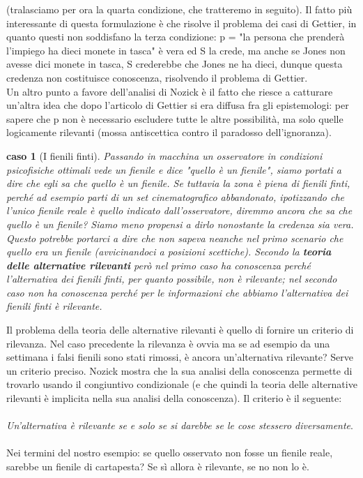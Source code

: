 \documentclass[10pt,a4paper]{article}
\newtheorem{caso}{caso}
\begin{document}
(tralasciamo per ora la quarta condizione, che tratteremo in seguito). Il fatto più interessante di questa formulazione è che risolve il problema dei casi di Gettier, in quanto questi non soddisfano la terza condizione: p = "la persona che prenderà l'impiego ha dieci monete in tasca" è vera ed S la crede, ma anche se Jones non avesse dici monete in tasca, S crederebbe che Jones ne ha dieci, dunque questa credenza non costituisce conoscenza, risolvendo il problema di Gettier.\\
Un altro punto a favore dell'analisi di Nozick è il fatto che riesce a catturare un'altra idea che dopo l'articolo di Gettier si era diffusa fra gli epistemologi: per sapere che p non è necessario escludere tutte le altre possibilità, ma solo quelle logicamente rilevanti (mossa antiscettica contro il paradosso dell'ignoranza). 
\begin{caso}[I fienili finti]
	Passando in macchina un osservatore in condizioni psicofisiche ottimali vede un fienile e dice "quello è un fienile", siamo portati a dire che egli sa che quello è un fienile. Se tuttavia la zona è piena di fienili finti, perché ad esempio parti di un set cinematografico abbandonato, ipotizzando che l'unico fienile reale è quello indicato dall'osservatore, diremmo ancora che sa che quello è un fienile? Siamo meno propensi a dirlo nonostante la credenza sia vera.\\
	Questo potrebbe portarci a dire che non sapeva neanche nel primo scenario che quello era un fienile (avvicinandoci a posizioni scettiche). Secondo la \textbf{teoria delle alternative rilevanti} però nel primo caso ha conoscenza perché l'alternativa dei fienili finti, per quanto possibile, non è rilevante; nel secondo caso non ha conoscenza perché per le informazioni che abbiamo l'alternativa dei fienili finti è rilevante.
\end{caso}
Il problema della teoria delle alternative rilevanti è quello di fornire un criterio di rilevanza. Nel caso precedente la rilevanza è ovvia ma se ad esempio da una settimana i falsi fienili sono stati rimossi, è ancora un'alternativa rilevante? Serve un criterio preciso. Nozick mostra che la sua analisi della conoscenza permette di trovarlo usando il congiuntivo condizionale (e che quindi la teoria delle alternative rilevanti è implicita nella sua analisi della conoscenza). Il criterio è il seguente:\\\\
\textit{Un'alternativa è rilevante se e solo se si darebbe se le cose stessero diversamente}.\\\\
Nei termini del nostro esempio: se quello osservato non fosse un fienile reale, sarebbe un fienile di cartapesta? Se sì allora è rilevante, se no non lo è.
\end{document}
